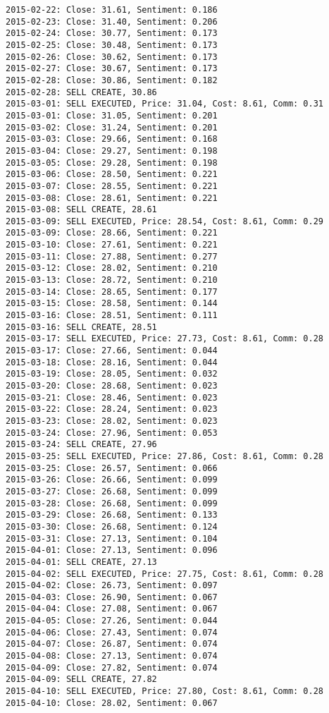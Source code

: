 \documentclass[11pt]{article}
\begin{document}
\begin{Verbatim}[commandchars=\\\{\}]
2015-02-22: Close: 31.61, Sentiment: 0.186
2015-02-23: Close: 31.40, Sentiment: 0.206
2015-02-24: Close: 30.77, Sentiment: 0.173
2015-02-25: Close: 30.48, Sentiment: 0.173
2015-02-26: Close: 30.62, Sentiment: 0.173
2015-02-27: Close: 30.67, Sentiment: 0.173
2015-02-28: Close: 30.86, Sentiment: 0.182
2015-02-28: SELL CREATE, 30.86
2015-03-01: SELL EXECUTED, Price: 31.04, Cost: 8.61, Comm: 0.31
2015-03-01: Close: 31.05, Sentiment: 0.201
2015-03-02: Close: 31.24, Sentiment: 0.201
2015-03-03: Close: 29.66, Sentiment: 0.168
2015-03-04: Close: 29.27, Sentiment: 0.198
2015-03-05: Close: 29.28, Sentiment: 0.198
2015-03-06: Close: 28.50, Sentiment: 0.221
2015-03-07: Close: 28.55, Sentiment: 0.221
2015-03-08: Close: 28.61, Sentiment: 0.221
2015-03-08: SELL CREATE, 28.61
2015-03-09: SELL EXECUTED, Price: 28.54, Cost: 8.61, Comm: 0.29
2015-03-09: Close: 28.66, Sentiment: 0.221
2015-03-10: Close: 27.61, Sentiment: 0.221
2015-03-11: Close: 27.88, Sentiment: 0.277
2015-03-12: Close: 28.02, Sentiment: 0.210
2015-03-13: Close: 28.72, Sentiment: 0.210
2015-03-14: Close: 28.65, Sentiment: 0.177
2015-03-15: Close: 28.58, Sentiment: 0.144
2015-03-16: Close: 28.51, Sentiment: 0.111
2015-03-16: SELL CREATE, 28.51
2015-03-17: SELL EXECUTED, Price: 27.73, Cost: 8.61, Comm: 0.28
2015-03-17: Close: 27.66, Sentiment: 0.044
2015-03-18: Close: 28.16, Sentiment: 0.044
2015-03-19: Close: 28.05, Sentiment: 0.032
2015-03-20: Close: 28.68, Sentiment: 0.023
2015-03-21: Close: 28.46, Sentiment: 0.023
2015-03-22: Close: 28.24, Sentiment: 0.023
2015-03-23: Close: 28.02, Sentiment: 0.023
2015-03-24: Close: 27.96, Sentiment: 0.053
2015-03-24: SELL CREATE, 27.96
2015-03-25: SELL EXECUTED, Price: 27.86, Cost: 8.61, Comm: 0.28
2015-03-25: Close: 26.57, Sentiment: 0.066
2015-03-26: Close: 26.66, Sentiment: 0.099
2015-03-27: Close: 26.68, Sentiment: 0.099
2015-03-28: Close: 26.68, Sentiment: 0.099
2015-03-29: Close: 26.68, Sentiment: 0.133
2015-03-30: Close: 26.68, Sentiment: 0.124
2015-03-31: Close: 27.13, Sentiment: 0.104
2015-04-01: Close: 27.13, Sentiment: 0.096
2015-04-01: SELL CREATE, 27.13
2015-04-02: SELL EXECUTED, Price: 27.75, Cost: 8.61, Comm: 0.28
2015-04-02: Close: 26.73, Sentiment: 0.097
2015-04-03: Close: 26.90, Sentiment: 0.067
2015-04-04: Close: 27.08, Sentiment: 0.067
2015-04-05: Close: 27.26, Sentiment: 0.044
2015-04-06: Close: 27.43, Sentiment: 0.074
2015-04-07: Close: 26.87, Sentiment: 0.074
2015-04-08: Close: 27.13, Sentiment: 0.074
2015-04-09: Close: 27.82, Sentiment: 0.074
2015-04-09: SELL CREATE, 27.82
2015-04-10: SELL EXECUTED, Price: 27.80, Cost: 8.61, Comm: 0.28
2015-04-10: Close: 28.02, Sentiment: 0.067

\end{Verbatim}
\end{document}
